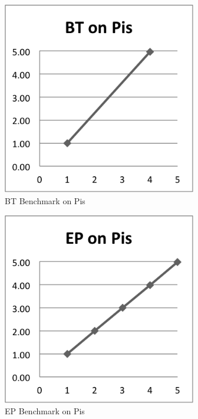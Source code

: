 \documentclass{acm_proc_article-sp}
\begin{document}
\begin{figure}[tbp]
  \centering
  \caption{BT Benchmark on Pis}
	\label{PiBT}
  \includegraphics[width=20pc]{Pics-Pi/BT.png}
\end{figure}

\begin{figure}[tbp]
  \centering
  \caption{EP Benchmark on Pis}
	\label{PiEP}
  \includegraphics[width=20pc]{Pics-Pi/EP.png}
\end{figure}
\end{document}
